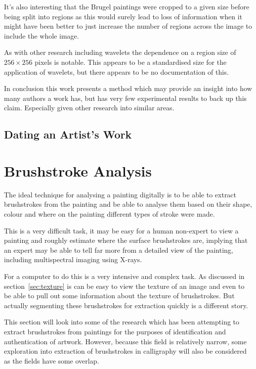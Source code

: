 \documentclass[conference]{IEEEtran}
\begin{document}
It's also interesting that the Brugel paintings were cropped to a given size
before being split into regions as this would surely lead to loss of
information when it might have been better to just increase the number of
regions across the image to include the whole image.

As with other research including wavelets the dependence on a region size of
$256 \times 256$ pixels is notable. This appears to be a standardised size for
the application of wavelets, but there appears to be no documentation of this.

In conclusion this work presents a method which may provide an insight into how
many authors a work has, but has very few experimental results to back up this
claim. Especially given other research into similar areas.


\subsection{Dating an Artist's Work}

\section{Brushstroke Analysis}

The ideal technique for analysing a painting digitally is to be able to extract
brushstrokes from the painting and be able to analyse them based on their
shape, colour and where on the painting different types of stroke were made.

This is a very difficult task, it may be easy for a human non-expert to view a
painting and roughly estimate where the surface brushstrokes are, implying that
an expert may be able to tell far more from a detailed view of the painting,
including multispectral imaging using X-rays.

For a computer to do this is a very intensive and complex task. As discussed
in section~\ref{sec:texture} is can be easy to view the texture of an image and
even to be able to pull out some information about the texture of brushstrokes.
But actually segmenting these brushstrokes for extraction quickly is a
different story.

This section will look into some of the research which has been attempting to
extract brushstrokes from paintings for the purposes of identification and
authentication of artwork. However, because this field is relatively narrow,
some exploration into extraction of brushstrokes in calligraphy will also be
considered as the fields have some overlap.
\end{document}
